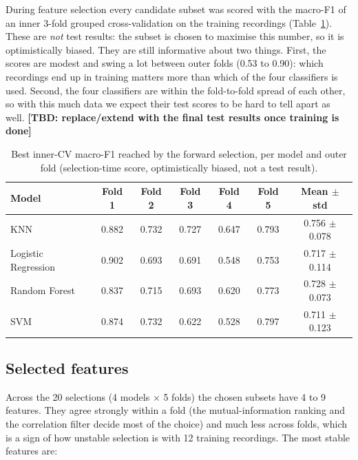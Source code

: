 \documentclass[10pt,a4paper]{article}
\newcommand{\tbd}[1]{\textbf{\textcolor{red!70!black}{[TBD: #1]}}}
\begin{document}
During feature selection every candidate subset was scored with the macro-F1 of an inner 3-fold grouped cross-validation on the training recordings (Table~\ref{tab:inner}). These are \emph{not} test results: the subset is chosen to maximise this number, so it is optimistically biased. They are still informative about two things. First, the scores are modest and swing a lot between outer folds (0.53 to 0.90): which recordings end up in training matters more than which of the four classifiers is used. Second, the four classifiers are within the fold-to-fold spread of each other, so with this much data we expect their test scores to be hard to tell apart as well. \tbd{replace/extend with the final test results once training is done}

\begin{table}[!htbp]
\centering
\caption{Best inner-CV macro-F1 reached by the forward selection, per model and outer fold (selection-time score, optimistically biased, not a test result).}
\label{tab:inner}
\small
\begin{tabular}{lcccccc}
\toprule
Model & Fold 1 & Fold 2 & Fold 3 & Fold 4 & Fold 5 & Mean $\pm$ std\\
\midrule
KNN                 & 0.882 & 0.732 & 0.727 & 0.647 & 0.793 & 0.756 $\pm$ 0.078\\
Logistic Regression & 0.902 & 0.693 & 0.691 & 0.548 & 0.753 & 0.717 $\pm$ 0.114\\
Random Forest       & 0.837 & 0.715 & 0.693 & 0.620 & 0.773 & 0.728 $\pm$ 0.073\\
SVM                 & 0.874 & 0.732 & 0.622 & 0.528 & 0.797 & 0.711 $\pm$ 0.123\\
\bottomrule
\end{tabular}
\end{table}

\subsection{Selected features}

Across the 20 selections (4 models $\times$ 5 folds) the chosen subsets have 4 to 9 features. They agree strongly within a fold (the mutual-information ranking and the correlation filter decide most of the choice) and much less across folds, which is a sign of how unstable selection is with 12 training recordings. The most stable features are:
\end{document}
